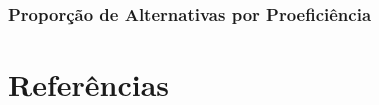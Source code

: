 \documentclass[
  portuguese,
  11pt,
  a4paper,
  DIV=11,
  numbers=noendperiod]{scrreprt}
\begin{document}
\subsection{Proporção de Alternativas por
Proeficiência}\label{proporuxe7uxe3o-de-alternativas-por-proeficiuxeancia}


\chapter*{Referências}\label{referuxeancias}


\label{refs}
\end{document}
